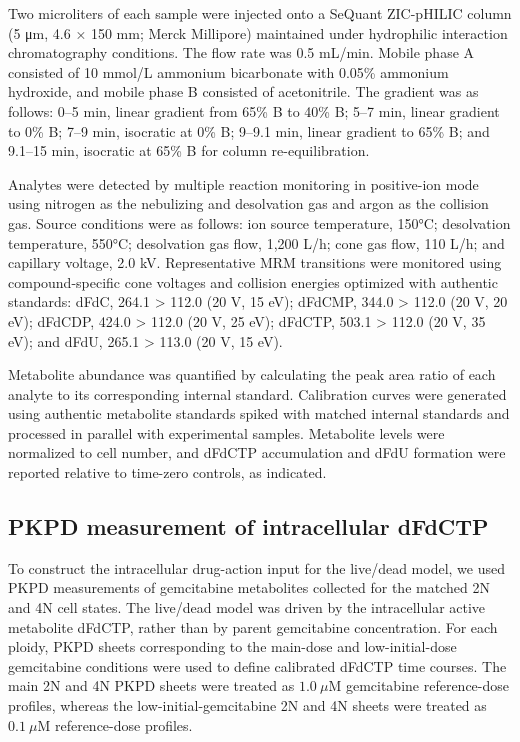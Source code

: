 \documentclass[11pt,notitlepage]{article}
\begin{document}
Two microliters of each sample were injected onto a SeQuant ZIC-pHILIC column (5 μm, 4.6 × 150 mm; Merck Millipore) maintained under hydrophilic interaction chromatography conditions. The flow rate was 0.5 mL/min. Mobile phase A consisted of 10 mmol/L ammonium bicarbonate with 0.05\% ammonium hydroxide, and mobile phase B consisted of acetonitrile. The gradient was as follows: 0–5 min, linear gradient from 65\% B to 40\% B; 5–7 min, linear gradient to 0\% B; 7–9 min, isocratic at 0\% B; 9–9.1 min, linear gradient to 65\% B; and 9.1–15 min, isocratic at 65\% B for column re-equilibration.

Analytes were detected by multiple reaction monitoring in positive-ion mode using nitrogen as the nebulizing and desolvation gas and argon as the collision gas. Source conditions were as follows: ion source temperature, 150°C; desolvation temperature, 550°C; desolvation gas flow, 1,200 L/h; cone gas flow, 110 L/h; and capillary voltage, 2.0 kV. Representative MRM transitions were monitored using compound-specific cone voltages and collision energies optimized with authentic standards: dFdC, 264.1 > 112.0 (20 V, 15 eV); dFdCMP, 344.0 > 112.0 (20 V, 20 eV); dFdCDP, 424.0 > 112.0 (20 V, 25 eV); dFdCTP, 503.1 > 112.0 (20 V, 35 eV); and dFdU, 265.1 > 113.0 (20 V, 15 eV). 

Metabolite abundance was quantified by calculating the peak area ratio of each analyte to its corresponding internal standard. Calibration curves were generated using authentic metabolite standards spiked with matched internal standards and processed in parallel with experimental samples. Metabolite levels were normalized to cell number, and dFdCTP accumulation and dFdU formation were reported relative to time-zero controls, as indicated.

\subsection{PKPD measurement of intracellular dFdCTP}   \label{sec:methods-pkpd-dfdctp}
To construct the intracellular drug-action input for the live/dead model, we used PKPD measurements of gemcitabine metabolites collected for the matched 2N and 4N cell states. The live/dead model was driven by the intracellular active metabolite dFdCTP, rather than by parent gemcitabine concentration. For each ploidy, PKPD sheets corresponding to the main-dose and low-initial-dose gemcitabine conditions were used to define calibrated dFdCTP time courses. The main 2N and 4N PKPD sheets were treated as \(1.0~\mu\mathrm{M}\) gemcitabine reference-dose profiles, whereas the low-initial-gemcitabine 2N and 4N sheets were treated as \(0.1~\mu\mathrm{M}\) reference-dose profiles.
\end{document}
